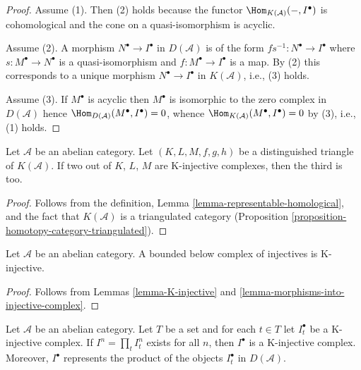 \begin{proof}
Assume (1). Then (2) holds because the functor
$\Hom_{K(\mathcal{A})}( - , I^\bullet)$ is cohomological
and the cone on a quasi-isomorphism is acyclic.

\medskip\noindent
Assume (2). A morphism $N^\bullet \to I^\bullet$ in $D(\mathcal{A})$
is of the form $fs^{-1} : N^\bullet \to I^\bullet$ where
$s : M^\bullet \to N^\bullet$ is a quasi-isomorphism and
$f : M^\bullet \to I^\bullet$ is a map. By (2) this corresponds to
a unique morphism $N^\bullet \to I^\bullet$ in $K(\mathcal{A})$, i.e.,
(3) holds.

\medskip\noindent
Assume (3). If $M^\bullet$ is acyclic then $M^\bullet$ is isomorphic
to the zero complex in $D(\mathcal{A})$ hence
$\Hom_{D(\mathcal{A})}(M^\bullet, I^\bullet) = 0$, whence
$\Hom_{K(\mathcal{A})}(M^\bullet, I^\bullet) = 0$ by (3),
i.e., (1) holds.
\end{proof}

\begin{lemma}
\label{lemma-triangle-K-injective}
Let $\mathcal{A}$ be an abelian category. Let $(K, L, M, f, g, h)$
be a distinguished triangle of $K(\mathcal{A})$. If two out of
$K$, $L$, $M$ are K-injective complexes, then the third is too.
\end{lemma}

\begin{proof}
Follows from the definition,
Lemma \ref{lemma-representable-homological}, and
the fact that $K(\mathcal{A})$ is a triangulated category
(Proposition \ref{proposition-homotopy-category-triangulated}).
\end{proof}

\begin{lemma}
\label{lemma-bounded-below-injectives-K-injective}
Let $\mathcal{A}$ be an abelian category. A bounded below complex of
injectives is K-injective.
\end{lemma}

\begin{proof}
Follows from
Lemmas \ref{lemma-K-injective} and
\ref{lemma-morphisms-into-injective-complex}.
\end{proof}

\begin{lemma}
\label{lemma-product-K-injective}
Let $\mathcal{A}$ be an abelian category. Let $T$ be a set and for
each $t \in T$ let $I_t^\bullet$ be a K-injective complex. If
$I^n = \prod_t I_t^n$ exists for all $n$, then $I^\bullet$ is
a K-injective complex. Moreover, $I^\bullet$ represents the
product of the objects $I_t^\bullet$ in $D(\mathcal{A})$.
\end{lemma}

